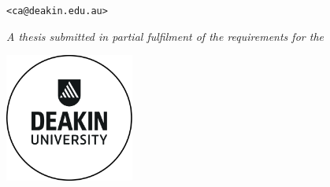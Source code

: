 \vspace*{\fill}
\thispagestyle{empty}
\linespread{1.2}

\centering

\Large
\textbf{\thetitle{}}
\vspace{0.9 cm}


\theauthor{}\\
\normalsize \theauthorspostnominals{}\\
\texttt{<ca@deakin.edu.au>}
\vspace{0.75 cm}

%
\itshape
A thesis submitted in partial fulfilment of the requirements for the\\
\upshape
\thedegree

\vspace{2 cm}
\includegraphics[width=120pt]{frontmatter/figures/deakin}
\vspace{2 cm}

\upshape\large
\thedepartment{}\\
\theinstitution{}\\
\thelocation

\vspace{1cm}
\thedate{}
\vspace*{\fill}

\justify
\normalsize
\restoregeometry